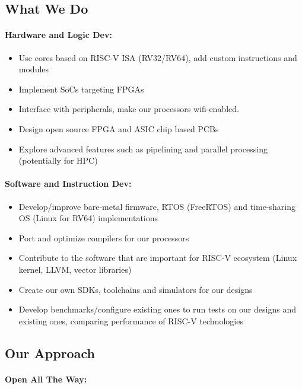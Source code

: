 \documentclass{article}
\begin{document}
\subsection{What We Do}

\paragraph{Hardware and Logic Dev:}

\begin{itemize}
    \item Use cores based on RISC-V ISA (RV32/RV64), add custom instructions and modules
    \item Implement SoCs targeting FPGAs
    \item Interface with peripherals, make our processors wifi-enabled.
    \item Design open source FPGA and ASIC chip based PCBs 
    \item Explore advanced features such as pipelining and parallel processing (potentially for HPC)
\end{itemize}
\paragraph{Software and Instruction Dev:}

\begin{itemize}
    \item Develop/improve bare-metal firmware, RTOS (FreeRTOS) and time-sharing OS (Linux for RV64) implementations
    \item Port and optimize compilers for our processors
    \item Contribute to the software that are important for RISC-V ecosystem (Linux kernel, LLVM, vector libraries)
    \item Create our own SDKs, toolchains and simulators for our designs
    \item Develop benchmarks/configure existing ones to run tests on our designs and existing ones, comparing performance of RISC-V technologies
\end{itemize}

\subsection{Our Approach}

\paragraph{Open All The Way:}
\end{document}
